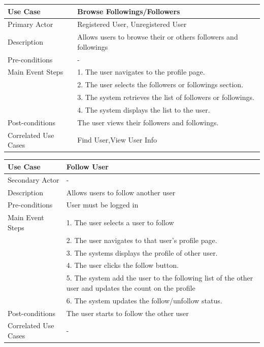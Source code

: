 \begin{longtable}{|p{}|p{}|}
    \hline
    \rowcolor{lightblue}
    \textbf{Use Case} & \textbf{Browse Followings/Followers} \\
    \hline
    Primary Actor & Registered User, Unregistered User\\
    \hline
    Description & Allows users to browse their or others followers and followings\\
    \hline
    Pre-conditions & - \\
    \hline
    Main Event Steps & 1. The user navigates to the profile page.\\
    & 2. The user selects the followers or followings section. \\
    & 3. The system retrieves the list of followers or followings. \\
    & 4. The system displays the list to the user. \\
    \hline
    Post-conditions & The user views their followers and followings.\\
    \hline
    Correlated Use Cases &Find User,View User Info \\
    \hline
\end{longtable}

\begin{longtable}{|p{}|p{}|}
    \hline
    \rowcolor{lightblue}
    \textbf{Use Case} & \textbf{Follow User} \\
    \hline
    Secondary Actor & -\\
    \hline
    Description & Allows users to follow another user\\
    \hline
    Pre-conditions & User must be logged in\\
    \hline
    Main Event Steps &  1. The user selects a user to follow \\
    & 2. The user navigates to that user's profile page. \\
    & 3. The systems displays the profile of other user. \\
    & 4. The user clicks the follow button. \\
    & 5. The system add the user to the following list of the other user and updates the count on the profile \\
    & 6. The system updates the follow/unfollow status. \\
    \hline
    Post-conditions &The user starts to follow the other user \\
    \hline
    Correlated Use Cases & -\\
    \hline
\end{longtable}


